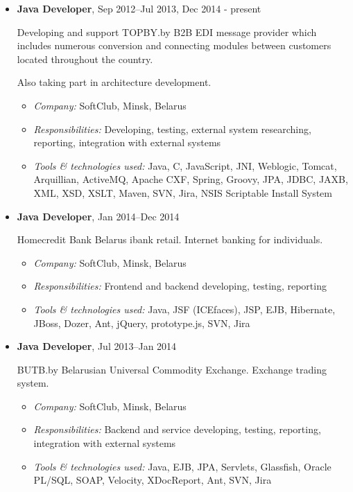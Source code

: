 \documentclass[a4paper, 12pt]{article}
\newcommand{\position}[1]{
    \textbf{#1}}
\newcommand{\itemlabel}[1]{
    \textit{#1:}}
\begin{document}
    \begin{itemize}

   
        \item \position{Java Developer}, Sep 2012--Jul 2013, Dec 2014 - present

            Developing and support TOPBY.by B2B EDI message provider which includes numerous conversion and connecting modules between customers located throughout the country.

            Also taking part in architecture development.

            \begin{itemize}
                \item \itemlabel{Company} SoftClub, Minsk, Belarus
                \item \itemlabel{Responsibilities} Developing, testing, external system researching, reporting, integration with external systems
                \item \itemlabel{Tools \& technologies used} Java, C, JavaScript, JNI, Weblogic, Tomcat, Arquillian, ActiveMQ, Apache CXF, Spring, Groovy, JPA, JDBC, JAXB, XML, XSD, XSLT, Maven, SVN, Jira, NSIS Scriptable Install System
            \end{itemize}
            
        \item \position{Java Developer}, Jan 2014--Dec 2014

           Homecredit Bank Belarus ibank retail. Internet banking for individuals. 

            \begin{itemize}
                \item \itemlabel{Company} SoftClub, Minsk, Belarus
                \item \itemlabel{Responsibilities} Frontend and backend developing, testing, reporting
                \item \itemlabel{Tools \& technologies used} Java, JSF (ICEfaces), JSP, EJB, Hibernate, JBoss, Dozer, Ant, jQuery, prototype.js, SVN, Jira
            \end{itemize}


        \item \position{Java Developer}, Jul 2013--Jan 2014

            BUTB.by Belarusian Universal Commodity Exchange. Exchange trading system.

            \begin{itemize}
                \item \itemlabel{Company} SoftClub, Minsk, Belarus
                \item \itemlabel{Responsibilities} Backend and service developing, testing, reporting, integration with external systems
                \item \itemlabel{Tools \& technologies used} Java, EJB, JPA, Servlets, Glassfish, Oracle PL/SQL, SOAP, Velocity, XDocReport, Ant, SVN, Jira
            \end{itemize}

    \end{itemize}    
    
\end{document}
